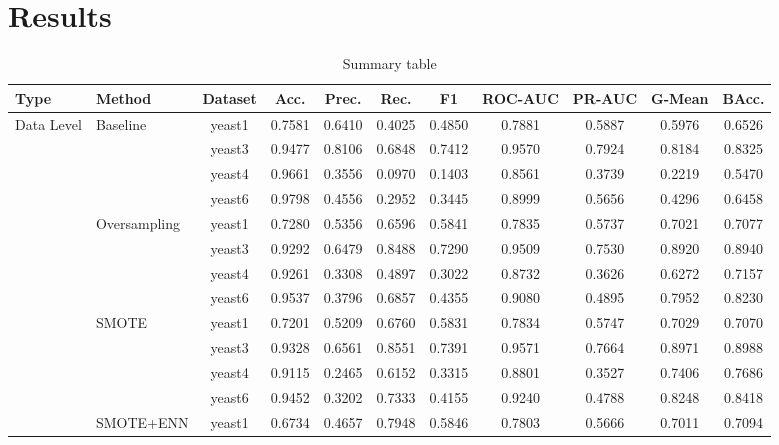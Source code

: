 \documentclass[sigconf]{acmart}
\begin{document}
\section{Results}


\clearpage
\begin{table}[htbp]
  \centering
  \caption{Summary table}
  \label{tab:full_summary}
  \footnotesize
  \setlength{\tabcolsep}{3.5pt}
  \begin{tabular}{llccccccccc}
    \toprule
    \textbf{Type} & \textbf{Method} & \textbf{Dataset} & \textbf{Acc.} & \textbf{Prec.} & \textbf{Rec.} & \textbf{F1} & \textbf{ROC-AUC} & \textbf{PR-AUC} & \textbf{G-Mean} & \textbf{BAcc.} \\
    \midrule
    \multirow{16}{*}{Data Level}
    & \multirow{4}{*}{Baseline}
      & yeast1 & 0.7581 & 0.6410 & 0.4025 & 0.4850 & 0.7881 & 0.5887 & 0.5976 & 0.6526 \\
    & & yeast3 & 0.9477 & 0.8106 & 0.6848 & 0.7412 & 0.9570 & 0.7924 & 0.8184 & 0.8325 \\
    & & yeast4 & 0.9661 & 0.3556 & 0.0970 & 0.1403 & 0.8561 & 0.3739 & 0.2219 & 0.5470 \\
    & & yeast6 & 0.9798 & 0.4556 & 0.2952 & 0.3445 & 0.8999 & 0.5656 & 0.4296 & 0.6458 \\
    \cmidrule{2-11}
    & \multirow{4}{*}{Oversampling}
      & yeast1 & 0.7280 & 0.5356 & 0.6596 & 0.5841 & 0.7835 & 0.5737 & 0.7021 & 0.7077 \\
    & & yeast3 & 0.9292 & 0.6479 & 0.8488 & 0.7290 & 0.9509 & 0.7530 & 0.8920 & 0.8940 \\
    & & yeast4 & 0.9261 & 0.3308 & 0.4897 & 0.3022 & 0.8732 & 0.3626 & 0.6272 & 0.7157 \\
    & & yeast6 & 0.9537 & 0.3796 & 0.6857 & 0.4355 & 0.9080 & 0.4895 & 0.7952 & 0.8230 \\
    \cmidrule{2-11}
    & \multirow{4}{*}{SMOTE}
      & yeast1 & 0.7201 & 0.5209 & 0.6760 & 0.5831 & 0.7834 & 0.5747 & 0.7029 & 0.7070 \\
    & & yeast3 & 0.9328 & 0.6561 & 0.8551 & 0.7391 & 0.9571 & 0.7664 & 0.8971 & 0.8988 \\
    & & yeast4 & 0.9115 & 0.2465 & 0.6152 & 0.3315 & 0.8801 & 0.3527 & 0.7406 & 0.7686 \\
    & & yeast6 & 0.9452 & 0.3202 & 0.7333 & 0.4155 & 0.9240 & 0.4788 & 0.8248 & 0.8418 \\
    \cmidrule{2-11}
    & \multirow{4}{*}{SMOTE+ENN}
      & yeast1 & 0.6734 & 0.4657 & 0.7948 & 0.5846 & 0.7803 & 0.5666 & 0.7011 & 0.7094 \\

\end{tabular}
\end{table}
\end{document}
